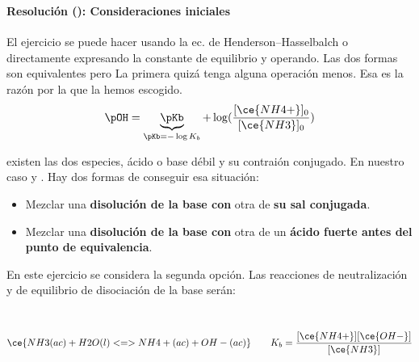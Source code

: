 \begin{frame}
	\frametitle{\ejerciciocmd}
	\framesubtitle{Resolución (): Consideraciones iniciales}
	El ejercicio se puede hacer usando la ec. de Henderson--Hasselbalch o directamente expresando la constante de equilibrio y operando. Las dos formas son equivalentes pero La primera quizá tenga alguna operación menos. Esa es la razón por la que la hemos escogido.
	$$
		\pOH = \underbrace{\pKb}_{\pKb = -\log K_b} + \log(\frac{[\ce{NH4+}]_0}{[\ce{NH3}]_0})
	$$
	
	 existen las dos especies, ácido o base débil y su contraión conjugado. En nuestro caso  y . Hay dos formas de conseguir esa situación:
	\begin{itemize}
		\item Mezclar una \textbf{disolución de la base con} otra de \textbf{su sal conjugada}.
		\item Mezclar una \textbf{disolución de la base con} otra de un \textbf{ácido fuerte antes del punto de equivalencia}.
	\end{itemize}
	En este ejercicio se considera la segunda opción. Las reacciones de neutralización y de equilibrio de disociación de la base serán:
	\begin{center}
		\\
		$$
			\ce{NH3(ac) + H2O(l) <=> NH4+(ac) + OH-(ac)}\qquad K_b=\frac{[\ce{NH4+}][\ce{OH-}]}{[\ce{NH3}]}
		$$
	\end{center}
\end{frame}

